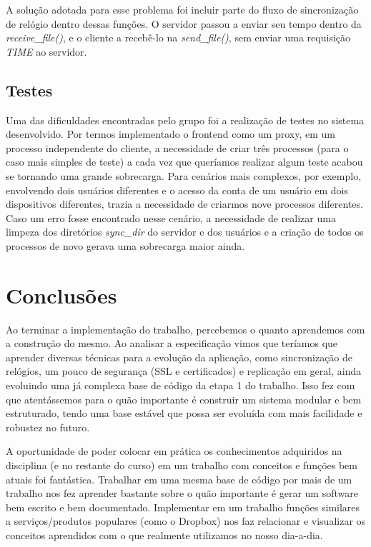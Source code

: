 \documentclass[a4paper]{article}
\begin{document}
A solução adotada para esse problema foi incluir parte do fluxo de sincronização de relógio dentro dessas funções. O servidor passou a enviar seu tempo dentro da \textit{receive\_file()}, e o cliente a recebê-lo na \textit{send\_file()}, sem enviar uma requisição \textit{TIME} ao servidor.

\subsection{Testes}

Uma das dificuldades encontradas pelo grupo foi a realização de testes no sistema desenvolvido. Por termos implementado o frontend como um proxy, em um processo independente do cliente, a necessidade de criar três processos (para o caso mais simples de teste) a cada vez que queríamos realizar algum teste acabou se tornando uma grande sobrecarga. Para cenários mais complexos, por exemplo, envolvendo dois usuários diferentes e o acesso da conta de um usuário em dois dispositivos diferentes, trazia a necessidade de criarmos nove processos diferentes. Caso um erro fosse encontrado nesse cenário, a necessidade de realizar uma limpeza dos diretórios \textit{sync\_dir} do servidor e dos usuários e a criação de todos os processos de novo gerava uma sobrecarga maior ainda.

\section{Conclusões}
Ao terminar a implementação do trabalho, percebemos o quanto aprendemos com a construção do mesmo. Ao analisar a especificação vimos que teríamos que aprender diversas técnicas para a evolução da aplicação, como sincronização de relógios, um pouco de segurança (SSL e certificados) e replicação em geral, ainda evoluindo uma já complexa base de código da etapa 1 do trabalho. Isso fez com que atentássemos para o quão importante é construir um sistema modular e bem estruturado, tendo uma base estável que possa ser evoluída com mais facilidade e robustez no futuro.

A oportunidade de poder colocar em prática os conhecimentos adquiridos na disciplina (e no restante do curso) em um trabalho com conceitos e funções bem atuais foi fantástica. Trabalhar em uma mesma base de código por mais de um trabalho nos fez aprender bastante sobre o quão importante  é gerar um software bem escrito e bem documentado. Implementar em um trabalho funções similares a serviços/produtos populares (como o Dropbox) nos faz relacionar e visualizar os conceitos aprendidos com o que realmente utilizamos no nosso dia-a-dia.
\end{document}
